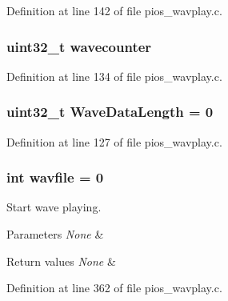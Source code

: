 \-Definition at line 142 of file pios\-\_\-wavplay.\-c.

\hypertarget{group___w_a_v_e_p_l_a_y_e_r___private___variables_ga39e802dfcf3592a17543c656dba18064}{
\subsubsection[{wavecounter}]{\setlength{\rightskip}{0pt plus 5cm}uint32\-\_\-t {\bf wavecounter}}}\label{group___w_a_v_e_p_l_a_y_e_r___private___variables_ga39e802dfcf3592a17543c656dba18064}


\-Definition at line 134 of file pios\-\_\-wavplay.\-c.

\hypertarget{group___w_a_v_e_p_l_a_y_e_r___private___variables_gaed5f7e51bea110d2f608278ffe6c48a3}{
\subsubsection[{\-Wave\-Data\-Length}]{\setlength{\rightskip}{0pt plus 5cm}uint32\-\_\-t {\bf \-Wave\-Data\-Length} = 0}}\label{group___w_a_v_e_p_l_a_y_e_r___private___variables_gaed5f7e51bea110d2f608278ffe6c48a3}


\-Definition at line 127 of file pios\-\_\-wavplay.\-c.

\hypertarget{group___w_a_v_e_p_l_a_y_e_r___private___variables_ga9fe4a9e502dfc977283819847ecc2351}{
\subsubsection[{wavfile}]{\setlength{\rightskip}{0pt plus 5cm}int {\bf wavfile} = 0}}\label{group___w_a_v_e_p_l_a_y_e_r___private___variables_ga9fe4a9e502dfc977283819847ecc2351}


\-Start wave playing. 


\begin{DoxyParams}{\-Parameters}
{\em \-None} & \\
\hline
\end{DoxyParams}

\begin{DoxyRetVals}{\-Return values}
{\em \-None} & \\
\hline
\end{DoxyRetVals}


\-Definition at line 362 of file pios\-\_\-wavplay.\-c.

